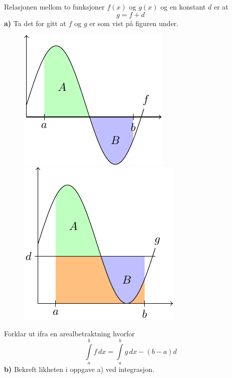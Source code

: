 \newpage
\nes
{}
Relasjonen mellom to funksjoner $ f(x) $ og $ g(x) $ og en konstant $ d $ er at
\[ g=f+d \]
\textbf{a)} Ta det for gitt at $ f $ og $ g $ er som vist på figuren under.
\begin{figure}
\centering
\includegraphics[scale=0.9]{../fig/int6a}\quad
\includegraphics[scale=0.9]{../fig/int6b}
\end{figure}
Forklar ut ifra en arealbetraktning hvorfor\[ \int\limits_a^b f \,dx=\int\limits_a^b g\,dx -(b-a)d  \]
\textbf{b)} Bekreft likheten i oppgave a) ved integrasjon.

